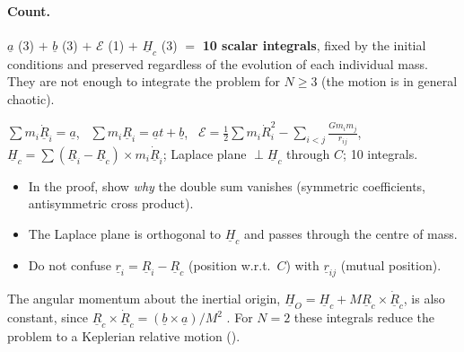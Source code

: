 \paragraph{Count.} $\underline a$ (3) $+$ $\underline b$ (3) $+$ $\mathcal E$ (1) $+$ $\underline H_c$ (3) $=$ \textbf{10 scalar integrals}, fixed
by the initial conditions and preserved regardless of the evolution of each individual mass. They are not enough to
integrate the problem for $N\ge3$ (the motion is in general chaotic).

\begin{keyf}
$\sum m_i\dot{\underline R}_i=\underline a$, \ $\sum m_i\underline R_i=\underline at+\underline b$, \ $\mathcal E=\frac12\sum m_i\dot R_i^2-\sum_{i<j}\frac{Gm_im_j}{r_{ij}}$,
\ $\underline H_c=\sum(\underline R_i-\underline R_c)\times m_i\dot{\underline R}_i$; Laplace plane $\perp\underline H_c$ through $C$; 10 integrals.
\end{keyf}

\pitfalls
\begin{itemize}
\item In the proof, show \emph{why} the double sum vanishes (symmetric coefficients, antisymmetric cross product).
\item The Laplace plane is orthogonal to $\underline H_c$ and passes through the centre of mass.
\item Do not confuse $\underline r_i=\underline R_i-\underline R_c$ (position w.r.t.\ $C$) with $\underline r_{ij}$ (mutual position).
\end{itemize}

\further
The angular momentum about the inertial origin, $\underline H_O=\underline H_c+M\underline R_c\times\dot{\underline R}_c$, is also constant, since
$\underline R_c\times\dot{\underline R}_c=(\underline b\times\underline a)/M^2$ \notinnotes. For $N=2$ these integrals reduce the problem to a
Keplerian relative motion ().

